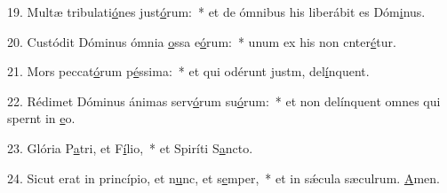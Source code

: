 19. Multæ tribulati\uline{ó}nes just\uline{ó}rum:~* et de ómnibus his liberábit es Dóm\uline{i}nus.\par 
20. Custódit Dóminus ómnia \uline{o}ssa e\uline{ó}rum:~* unum ex his non cnter\uline{é}tur.\par 
21. Mors peccat\uline{ó}rum p\uline{é}ssima:~* et qui odérunt justm, del\uline{í}nquent.\par 
22. Rédimet Dóminus ánimas serv\uline{ó}rum su\uline{ó}rum:~* et non delínquent omnes qui spernt in \uline{e}o.\par 
23. Glória P\uline{a}tri, et F\uline{í}lio,~* et Spiríti S\uline{a}ncto.\par 
24. Sicut erat in princípio, et n\uline{u}nc, et s\uline{e}mper,~* et in sǽcula sæculrum. \uline{A}men.\par 
